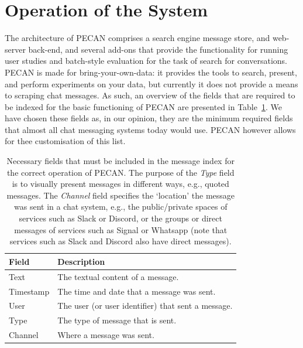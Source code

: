 \graphicspath{ {./images/} }
\section{Operation of the System}

The architecture of PECAN comprises a search engine message store, and web-server back-end, and several add-ons that provide the functionality for running user studies and batch-style evaluation for the task of search for conversations. PECAN is made for bring-your-own-data: it provides the tools to search, present, and perform experiments on your data, but currently it does not provide a means to scraping chat messages. As such, an overview of the fields that are required to be indexed for the basic functioning of PECAN are presented in Table~\ref{table:fields}. We have chosen these fields as, in our opinion, they are the minimum required fields that almost all chat messaging systems today would use. PECAN however allows for thee customisation of this list.

\begin{table}
\centering
\begin{tabular}{ll}
	\hline
	Field     & Description                                        \\ \hline
	Text      & The textual content of a message.                  \\
	Timestamp & The time and date that a message was sent.         \\
	User      & The user (or user identifier) that sent a message. \\
	Type      & The type of message that is sent.                  \\
	Channel   & Where a message was sent.                          \\ \hline
\end{tabular}
\caption{Necessary fields that must be included in the message index for the correct operation of PECAN. The purpose of the \textit{Type} field is to visually present messages in different ways, e.g., quoted messages. The \textit{Channel} field specifies the `location' the message was sent in a chat system, e.g., the public/private spaces of services such as Slack or Discord, or the groups or direct messages of services such as Signal or Whatsapp (note that services such as Slack and Discord also have direct messages).}
\label{table:fields}
\end{table}


